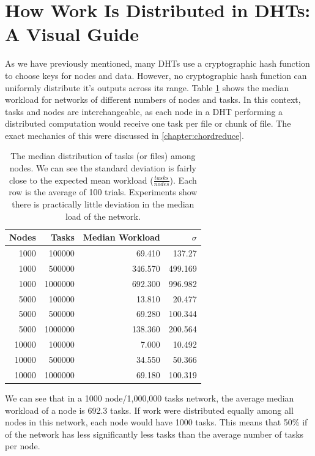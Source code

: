 \section{How Work Is Distributed in DHTs: A Visual Guide}

As we have previously mentioned, many DHTs use a cryptographic hash function to choose keys for nodes and data.
However, no cryptographic hash function can uniformly distribute it's outputs across its range. 
Table \ref{tab:medianLoads} shows the median workload for networks of different numbers of nodes and tasks.
In this context, tasks and nodes are interchangeable, as each node in a DHT performing a distributed computation would receive one task per file or chunk of file.
The exact mechanics of this were discussed in \ref{chapter:chordreduce}.


\begin{table}
	\centering
	\caption{The median distribution of tasks (or files) among nodes.  We can see the standard deviation is fairly close to the expected mean workload ($\frac{tasks}{nodes}$). Each row is the average of 100 trials.  Experiments show there is practically little deviation in the median load of the network.}
	\begin{tabular}{r r r r}
		Nodes & Tasks & Median Workload & $\sigma$ \\ \hline
		1000 & 100000 & 69.410   &  137.27  \\
		1000 & 500000 & 346.570  &  499.169 \\
		1000 & 1000000 & 692.300  &  996.982 \\
		
		5000 & 100000  & 13.810 & 20.477 \\ 
		5000 & 500000  & 69.280 & 100.344 \\ 
		5000 & 1000000 &138.360 & 200.564 \\ 
		
		10000 & 100000 & 7.000   &  10.492 \\
		10000 & 500000 & 34.550  &   50.366 \\
		10000 & 1000000& 69.180  &  100.319 \\
	\end{tabular}
	\label{tab:medianLoads}
\end{table}



We can see  that in a 1000 node/1,000,000 tasks network, the average median workload of a node is 692.3 tasks. 
If work were distributed equally among all nodes in this network, each node would have 1000 tasks.
This means that 50\% if of the network has less significantly less tasks than the average number of tasks per node.

